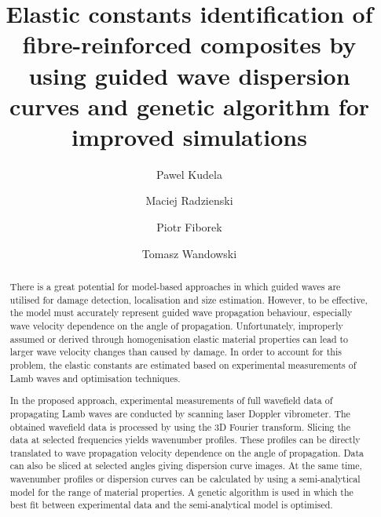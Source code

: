 \documentclass[preprint,12pt]{elsarticle}
\begin{document}
	\begin{frontmatter}
		
		\title{Elastic constants identification of fibre-reinforced composites by using guided wave dispersion curves and genetic algorithm for improved simulations}
		
		\address[IFFM]{Institute of Fluid Flow Machinery, Polish Academy of Sciences, Poland}
		
		\author{Pawel Kudela}
		\author{Maciej Radzienski}
		\author{Piotr Fiborek }
		\author{Tomasz Wandowski }	
		
		
\begin{abstract}
There is a great potential for model-based approaches in which guided waves are utilised for damage detection, localisation and size estimation. 
However, to be effective, the model must accurately represent guided wave propagation behaviour, especially wave velocity dependence on the angle of propagation. 
Unfortunately, improperly assumed or derived through homogenisation elastic material properties can lead to larger wave velocity changes than caused by damage. 
In order to account for this problem, the elastic constants are estimated based on experimental measurements of Lamb waves and optimisation techniques. 

In the proposed approach, experimental measurements of full wavefield data of propagating Lamb
waves are conducted by scanning laser Doppler vibrometer. 
The obtained wavefield data is processed by using the 3D Fourier transform. 
Slicing the data at selected frequencies yields wavenumber profiles. 
These profiles can be directly translated to wave propagation velocity dependence on the angle of propagation. 
Data can also be sliced at selected angles giving dispersion curve images. 
At the same time, wavenumber profiles or dispersion curves can be calculated by using a semi-analytical model for the range of material properties. 
A genetic algorithm is used in which the best fit between experimental data and the semi-analytical model is optimised.


\end{abstract}
\end{frontmatter}
\end{document}
